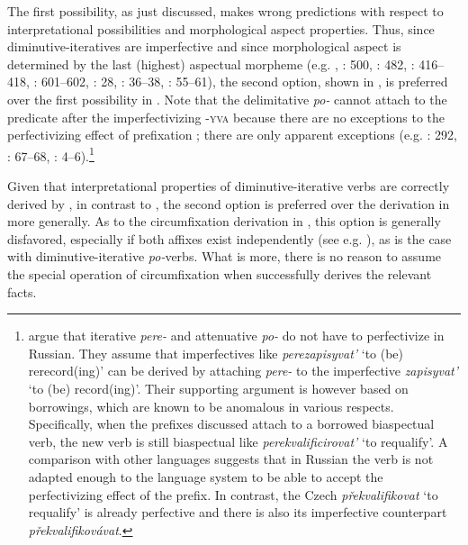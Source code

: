 \documentclass[output=paper,colorlinks,citecolor=brown]{langscibook}
\begin{document}
\noindent The first possibility, as just discussed, makes wrong predictions with respect to interpretational possibilities and morphological aspect properties. Thus, since diminutive-iteratives are imperfective and since morphological aspect is determined by the last (highest) aspectual morpheme (e.g. \citealt[96]{Karcevski1927}, \citealt{Vinogradov1947}: 500, \citealt{Dostal1954}: 482, \citealt{Isačenko1962}: 416--418, \citealt{Zinova.Filip2015}: 601--602, \citealt{Tatevosov2020}: 28, \citealt{Zinova2021}: 36--38, \citealt{bis:Biskup2020}: 55--61), the second option, shown in , is preferred over the first possibility in . Note that the delimitative \textit{po-} cannot attach to the predicate after the imperfectivizing \textsc{-yva} because there are no exceptions to the perfectivizing effect of prefixation \citep[242]{bis:Smith1997}; there are only apparent exceptions (e.g. \citealt{Schuyt1990}: 292, \citealt{Zaliznjak.Smelev1997}: 67--68, \citealt{Zaliznjak2017}: 4--6).\footnote{\citet[605--607]{Zinova.Filip2015} argue that iterative \textit{pere-} and attenuative \textit{po-} do not have to perfectivize in Russian. They assume that imperfectives like \textit{perezapisyvat’} ‘to (be) rerecord(ing)’ can be derived by attaching \textit{pere-} to the imperfective \textit{zapisyvat’} ‘to (be) record(ing)’. Their supporting argument is however based on borrowings, which are known to be anomalous in various respects. Specifically, when the prefixes discussed attach to a borrowed biaspectual verb, the new verb is still biaspectual like \textit{perekvalificirovat’} ‘to requalify’. A comparison with other languages suggests that in Russian the verb is not adapted enough to the language system to be able to accept the perfectivizing effect of the prefix. In contrast, the Czech \textit{překvalifikovat} ‘to requalify’ is already perfective and there is also its imperfective counterpart \textit{překvalifikovávat}.}

Given that interpretational properties of diminutive-iterative verbs are correctly derived by , in contrast to , the second option is preferred over the derivation in  more generally. As to the circumfixation derivation in , this option is generally disfavored, especially if both affixes exist independently (see e.g. \citealt{Marusic2023}), as is the case with diminutive-iterative \textit{po-}verbs. What is more, there is no reason to assume the special operation of circumfixation when  successfully derives the relevant facts.
\end{document}
